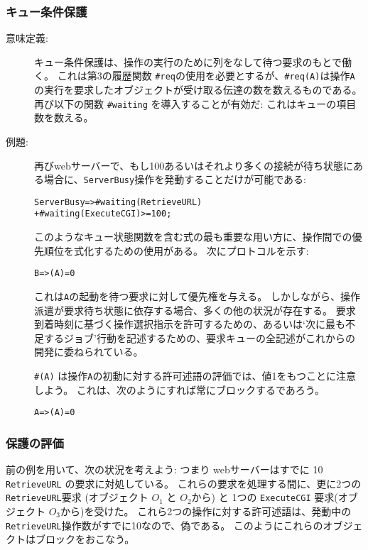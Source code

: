 \documentclass[\pformat,12pt]{jarticle}
\begin{document}
\subsubsection{キュー条件保護}\label{queuesec}
\begin{description}
\item[意味定義:] 
キュー条件保護は、操作の実行のために列をなして待つ要求のもとで働く。
これは第3の履歴関数 {\tt \#req}の使用を必要とするが、{\tt \#req(A)}は操作{\tt A}の実行を要求したオブジェクトが受け取る伝達の数を数えるものである。
再び以下の関数 {\tt \#waiting} を導入することが有効だ:
これはキューの項目数を数える。

\item[例題:] 
再びwebサーバーで、もし100あるいはそれより多くの接続が待ち状態にある場合に、\texttt{ServerBusy}操作を発動することだけが可能である:
\begin{alltt}
     ServerBusy  => #waiting(RetrieveURL) 
                      + #waiting(ExecuteCGI) >= 100;
\end{alltt}

このようなキュー状態関数を含む式の最も重要な用い方に、操作間での優先順位を式化するための使用がある。 
次にプロトコルを示す:
\begin{alltt}
     B => (A) = 0
\end{alltt}
これは{\tt A}の起動を待つ要求に対して優先権を与える。
しかしながら、操作派遣が要求待ち状態に依存する場合、多くの他の状況が存在する。
要求到着時刻に基づく操作選択指示を許可するための、あるいは`次に最も不足するジョブ'行動を記述するための、要求キューの全記述がこれからの開発に委ねられている。

 \texttt{\#(A)} は操作\texttt{A}の初動に対する許可述語の評価では、値1をもつことに注意しよう。
これは、次のようにすれば常にブロックするであろう。

\begin{alltt}
    A => (A) = 0
\end{alltt}

\end{description}

\subsubsection{保護の評価}

前の例を用いて、次の状況を考えよう: つまり webサーバーはすでに 10 \texttt{RetrieveURL} の要求に対処している。
これらの要求を処理する間に、更に2つの \texttt{RetrieveURL}要求 (オブジェクト $O_1$ と $O_2$から) と 1つの \texttt{ExecuteCGI} 要求(オブジェクト $O_3$から)を受けた。
これら2つの操作に対する許可述語は、発動中の\texttt{RetrieveURL}操作数がすでに10なので、偽である。
このようにこれらのオブジェクトはブロックをおこなう。
\end{document}

